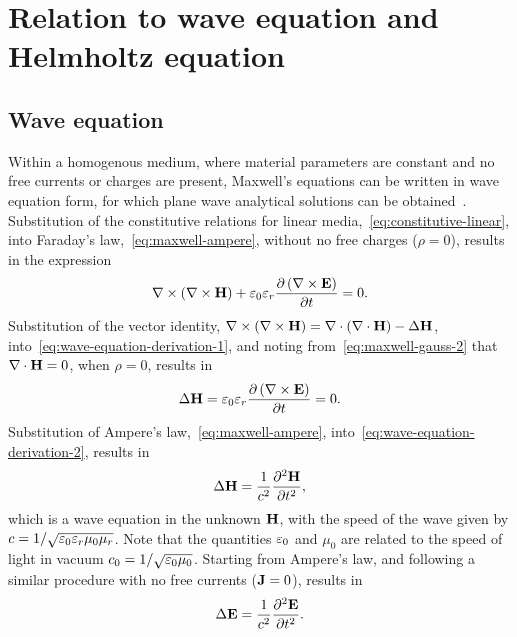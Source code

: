 \section{Relation to wave equation and Helmholtz equation}
\subsection{Wave equation}

Within a homogenous medium, where material parameters are constant and no free currents or charges are present, Maxwell's equations can be written in wave equation form, for which plane wave analytical solutions can be obtained~\cite{Jackson:490457}. Substitution of the constitutive relations for linear media,~\eqref{eq:constitutive-linear}, into Faraday's law,~\eqref{eq:maxwell-ampere}, without no free charges ($\rho = 0$), results in the expression
\begin{equation}
  \label{eq:wave-equation-derivation-1}
  \nabla \times ( \nabla \times \mathbf{H} ) + \varepsilon_0 \varepsilon_r \frac{\partial  \left( \nabla \times \mathbf{E}  \right) }{\partial t} = 0 .
\end{equation}
Substitution of the vector identity, $ \nabla \times ( \nabla \times \mathbf{H} ) = \nabla \cdot ( \nabla \cdot \mathbf{H} ) - \Delta \mathbf{H} $, into~\eqref{eq:wave-equation-derivation-1}, and noting from~\eqref{eq:maxwell-gauss-2} that $\nabla \cdot \mathbf{H} = 0$, when $\rho = 0$, results in
\begin{equation}
 \Delta \mathbf{H} = \varepsilon_0 \varepsilon_r \frac{\partial  \left( \nabla \times \mathbf{E}  \right) }{\partial t} = 0 . \label{eq:wave-equation-derivation-2}
\end{equation}
Substitution of Ampere's law,~\eqref{eq:maxwell-ampere}, into~\eqref{eq:wave-equation-derivation-2}, results in
\begin{equation}
  \label{eq:maxwell-wave-eqtn-H}
  \Delta \mathbf{H} = \frac{1}{c^2} \frac{\partial^2  \mathbf{H} }{\partial t^2},
\end{equation}
which is a wave equation in the unknown $\mathbf{H}$, with the speed of the wave given by $c = 1/\sqrt{\varepsilon_0 \varepsilon_r \mu_0 \mu_r }$. Note that the quantities $\varepsilon_0$ and $\mu_0$ are related to the speed of light in vacuum $c_0 = 1/\sqrt{\varepsilon_0 \mu_0 }$. Starting from Ampere's law, and following a similar procedure with no free currents ($ \mathbf{J} = 0 $), results in
\begin{equation}
  \label{eq:maxwell-wave-eqtn-E}
  \Delta \mathbf{E} = \frac{1}{c^2} \frac{\partial^2  \mathbf{E} }{\partial t^2} .
\end{equation}

